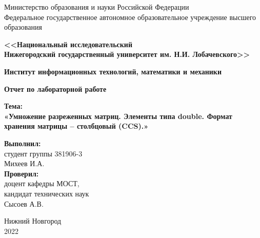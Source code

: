 \documentclass{report}
\begin{document}
\begin{titlepage}

\begin{center}
    Министерство образования и науки Российской Федерации \\
    Федеральное государственное автономное образовательное учреждение высшего образования
\end{center}
\begin{center}
    \textbf{<<Национальный исследовательский\\Нижегородский государственный университет им. Н.И. Лобачевского>>} \\
\end{center}
\begin{center}
    \textbf{Институт информационных технологий, математики и механики}\\
\end{center}

\vspace{4em}

\begin{center}
    \textbf{\Large Отчет по лабораторной работе} \\
\end{center}

\begin{center}
    \textbf{\Large Тема:} \\
    \vspace{1em}
    \textbf{\large «Умножение разреженных матриц. Элементы типа double. Формат хранения матрицы – столбцовый (CCS).»}
\end{center}

\vspace{4em}

\begin{flushright}
\begin{minipage}{0.4\textwidth}
\begin{flushleft}

\textbf{Выполнил:} \\
студент группы 381906-3 \\
Михеев И.А. \\

\textbf{Проверил:} \\
доцент кафедры МОСТ, \\
кандидат технических наук \\
Сысоев А.В. \\
\end{flushleft}
\end{minipage}
\end{flushright}
\vspace{\fill}
\begin{center}
Нижний Новгород \\
2022
\end{center}
\end{titlepage}
\end{document}
